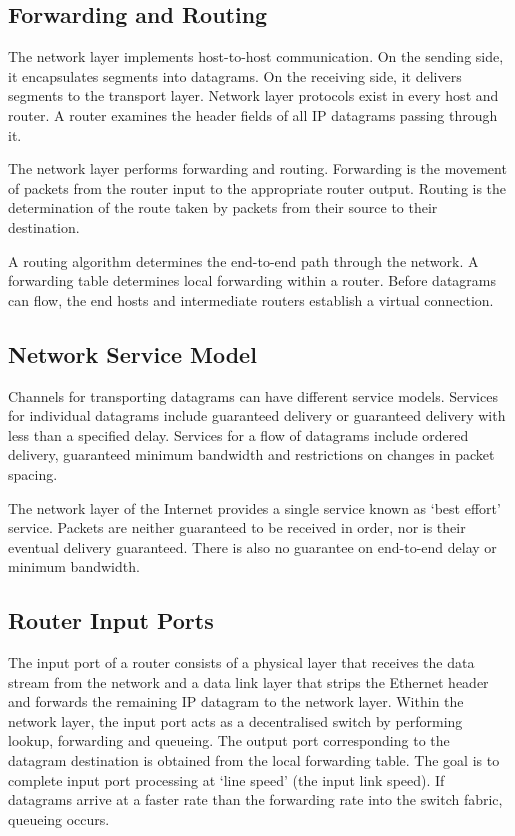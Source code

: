 \subsection{Forwarding and Routing}

The network layer implements host-to-host communication.
On the sending side, it encapsulates segments into datagrams.
On the receiving side, it delivers segments to the transport layer.
Network layer protocols exist in every host and router.
A router examines the header fields of all IP datagrams passing through it.

The network layer performs forwarding and routing.
Forwarding is the movement of packets from the router input to the appropriate router output.
Routing is the determination of the route taken by packets from their source to their destination.

A routing algorithm determines the end-to-end path through the network.
A forwarding table determines local forwarding within a router.
Before datagrams can flow, the end hosts and intermediate routers establish a virtual connection.

\subsection{Network Service Model}

Channels for transporting datagrams can have different service models.
Services for individual datagrams include guaranteed delivery or guaranteed delivery with less than a specified delay.
Services for a flow of datagrams include ordered delivery, guaranteed minimum bandwidth and restrictions on changes in packet spacing.

The network layer of the Internet provides a single service known as `best effort' service.
Packets are neither guaranteed to be received in order, nor is their eventual delivery guaranteed.
There is also no guarantee on end-to-end delay or minimum bandwidth.

\subsection{Router Input Ports}

The input port of a router consists of a physical layer that receives the data stream from the network and a data link layer that strips the Ethernet header and forwards the remaining IP datagram to the network layer.
Within the network layer, the input port acts as a decentralised switch by performing lookup, forwarding and queueing.
The output port corresponding to the datagram destination is obtained from the local forwarding table.
The goal is to complete input port processing at `line speed' (the input link speed).
If datagrams arrive at a faster rate than the forwarding rate into the switch fabric, queueing occurs.

